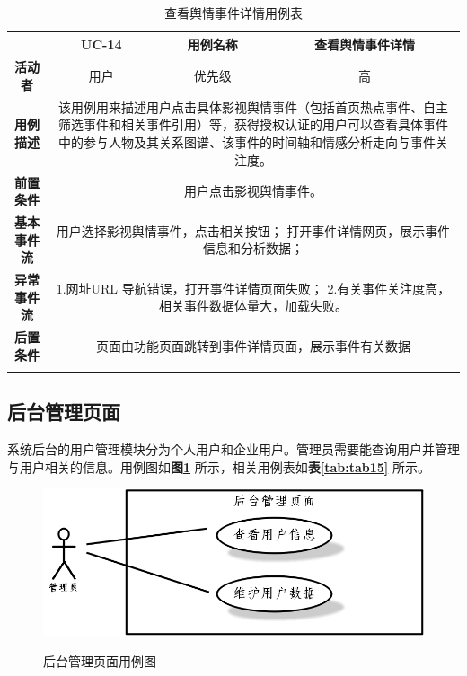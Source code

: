 \begin{longtable}[c]{c|ccc}
	\caption{查看舆情事件详情用例表}
	\label{tab:tab14}\\
	\shline
	\multicolumn{1}{c|}{\textbf{用例编号}} & \multicolumn{1}{c|}{UC-14} & \multicolumn{1}{c|}{用例名称} &  查看舆情事件详情\\ \hline
	\endhead
	\multicolumn{1}{c|}{\textbf{活动者}} & \multicolumn{1}{c|}{用户} & \multicolumn{1}{c|}{优先级} &高  \\ \hline
	\textbf{用例描述} & \multicolumn{3}{p{12cm}}{该用例用来描述用户点击具体影视舆情事件（包括首页热点事件、自主筛选事件和相关事件引用）等，获得授权认证的用户可以查看具体事件中的参与人物及其关系图谱、该事件的时间轴和情感分析走向与事件关注度。} \\ \hline
	\textbf{前置条件}& \multicolumn{3}{p{12cm}}{用户点击影视舆情事件。} \\ \hline
	\textbf{基本事件流}& \multicolumn{3}{p{12cm}}{用户选择影视舆情事件，点击相关按钮；\newline
		打开事件详情网页，展示事件信息和分析数据；
		} \\ \hline
	\textbf{异常事件流}& \multicolumn{3}{p{12cm}}{1.网址URL 导航错误，打开事件详情页面失败；\newline
		2.有关事件关注度高，相关事件数据体量大，加载失败。
	} \\ \hline
	\textbf{后置条件}& \multicolumn{3}{p{12cm}}{页面由功能页面跳转到事件详情页面，展示事件有关数据} \\ \shline
\end{longtable}

\subsection{后台管理页面}
系统后台的用户管理模块分为个人用户和企业用户。管理员需要能查询用户并管理与用户相关的信息。用例图如\textbf{图\ref{fig:fig6}} 所示，相关用例表如\textbf{表\ref{tab:tab15}} 所示。
\newpage
\begin{figure}[!htb]
	\centering\label{fig:fig6}
	\includegraphics[scale=0.5]{image/f6.png}
	\caption{后台管理页面用例图}
\end{figure}

